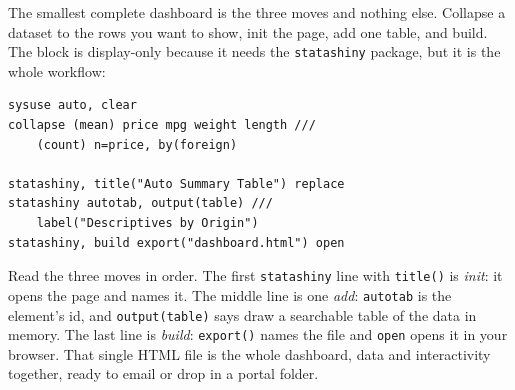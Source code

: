 \documentclass[
    a4paper,
    fontsize=10pt,
    twoside=true,
    numbers=noenddot,
]{kaobook}
\begin{document}
The smallest complete dashboard is the three moves and nothing else. Collapse a dataset to the rows you want to show, init the page, add one table, and build. The block is display-only because it needs the \texttt{statashiny} package, but it is the whole workflow:
\par
{\footnotesize
\begin{verbatim}
sysuse auto, clear
collapse (mean) price mpg weight length ///
    (count) n=price, by(foreign)

statashiny, title("Auto Summary Table") replace
statashiny autotab, output(table) ///
    label("Descriptives by Origin")
statashiny, build export("dashboard.html") open
\end{verbatim}
}
Read the three moves in order. The first \texttt{statashiny} line with \texttt{title()} is \emph{init}: it opens the page and names it. The middle line is one \emph{add}: \texttt{autotab} is the element's id, and \texttt{output(table)} says draw a searchable table of the data in memory. The last line is \emph{build}: \texttt{export()} names the file and \texttt{open} opens it in your browser. That single HTML file is the whole dashboard, data and interactivity together, ready to email or drop in a portal folder.
\end{document}
